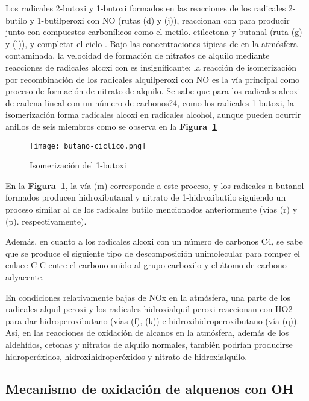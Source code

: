 {Los radicales 2-butoxi y 1-butoxi formados en las reacciones de los radicales 2-butilo y 1-butilperoxi con NO (rutas (d) y (j)), reaccionan con   para producir   junto con compuestos carbonílicos como el metilo. etilcetona y butanal (ruta (g) y (l)), y completar el ciclo . Bajo las concentraciones típicas de  en la atmósfera contaminada, la velocidad de formación de nitratos de alquilo mediante reacciones de radicales alcoxi con   es insignificante; la reacción de isomerización por recombinación de los radicales alquilperoxi con NO es la vía principal como proceso de formación de nitrato de alquilo. Se sabe que para los radicales alcoxi de cadena lineal con un número de carbonos?4, como los radicales 1-butoxi, la isomerización forma radicales alcoxi en radicales alcohol, aunque pueden ocurrir anillos de seis miembros como se observa en la \textbf{Figura~\ref{butcic}}
\begin{figure}[htbp]
\begin{center}
\texttt{[image: butano-ciclico.png]}
\caption{Isomerización del  1-butoxi}
\label{butcic}
\end{center}
\end{figure}

En la \textbf{Figura~\ref{butcic}}, la vía (m) corresponde a este proceso, y los radicales n-butanol formados producen hidroxibutanal y nitrato de 1-hidroxibutilo siguiendo un proceso similar al de los radicales butilo mencionados anteriormente (vías (r) y (p). respectivamente).

Además, en cuanto a los radicales alcoxi con un número de carbonos C4, se sabe que se produce el siguiente tipo de descomposición unimolecular para romper el enlace C-C entre el carbono unido al grupo carboxilo y el átomo de carbono adyacente.

En condiciones relativamente bajas de NOx en la atmósfera, una parte de los radicales alquil peroxi y los radicales hidroxialquil peroxi reaccionan con HO2 para dar hidroperoxibutano (vías (f), (k)) e hidroxihidroperoxibutano (vía (q)). Así, en las reacciones de oxidación de alcanos en la atmósfera, además de los aldehídos, cetonas y nitratos de alquilo normales, también podrían producirse hidroperóxidos, hidroxihidroperóxidos y nitrato de hidroxialquilo.

\subsection{Mecanismo de oxidaci\'on de alquenos con OH}

}
